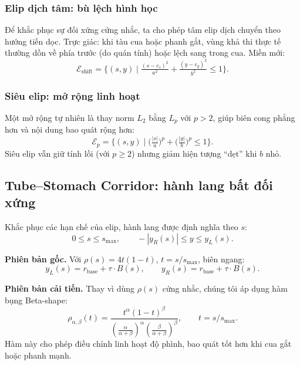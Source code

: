 \documentclass{IEEEtran}
\begin{document}
\subsubsection{Elip dịch tâm: bù lệch hình học}
Để khắc phục sự đối xứng cứng nhắc, ta cho phép tâm elip dịch chuyển theo hướng tiến dọc.
Trực giác: khi tàu cua hoặc phanh gắt, vùng khả thi thực tế thường dồn về phía trước
(do quán tính) hoặc lệch sang trong cua. Miền mới:
\[
\mathcal{E}_{\text{shift}} = \Big\{ (s,y) \;\Big|\;
\tfrac{(s-c_s)^2}{a^2} + \tfrac{(y-c_y)^2}{b^2} \leq 1 \Big\}.
\]

\subsubsection{Siêu elip: mở rộng linh hoạt}
Một mở rộng tự nhiên là thay norm $L_2$ bằng $L_p$ với $p>2$,
giúp biên cong phẳng hơn và nội dung bao quát rộng hơn:
\[
\mathcal{E}_{p} = \Big\{ (s,y) \;\Big|\;
\Big(\tfrac{|s|}{a}\Big)^p + \Big(\tfrac{|y|}{b}\Big)^p \leq 1 \Big\}.
\]
Siêu elip vẫn giữ tính lồi (với $p \geq 2$) nhưng giảm hiện tượng ``dẹt'' khi $b$ nhỏ.

\subsection{Tube--Stomach Corridor: hành lang bất đối xứng}\label{sec:tube-stomach}

Khắc phục các hạn chế của elip, hành lang được định nghĩa theo $s$:
\[
0 \leq s \leq s_{\max},
\qquad
-|y_R(s)| \leq y \leq y_L(s).
\]

\textbf{Phiên bản gốc.}
Với $\rho(s)=4t(1-t),\,t=s/s_{\max}$,
biên ngang:
\[
y_L(s) = r_{\text{base}} + \tau \cdot B(s), \qquad
y_R(s) = r_{\text{base}} + \tau \cdot B(s).
\]

\textbf{Phiên bản cải tiến.}
Thay vì dùng $\rho(s)$ cứng nhắc,
chúng tôi áp dụng hàm bụng Beta-shape:
\[
\rho_{\alpha,\beta}(t) =
\frac{t^{\alpha}(1-t)^{\beta}}
     {\left(\tfrac{\alpha}{\alpha+\beta}\right)^{\alpha}
      \left(\tfrac{\beta}{\alpha+\beta}\right)^{\beta}},
\qquad t = s/s_{\max}.
\]
Hàm này cho phép điều chỉnh linh hoạt độ phình,
bao quát tốt hơn khi cua gắt hoặc phanh mạnh.

\end{document}

